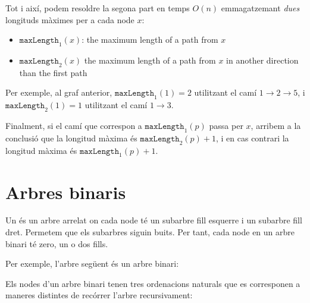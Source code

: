Tot i així, podem resoldre la segona part en temps $O(n)$
emmagatzemant \emph{dues} longituds màximes per a cada node $x$:
\begin{itemize}
\item $\texttt{maxLength}_1(x)$:
the maximum length of a path from $x$
\item $\texttt{maxLength}_2(x)$
the maximum length of a path from $x$
in another direction than the first path
\end{itemize}
Per exemple, al graf anterior, $\texttt{maxLength}_1(1)=2$ utilitzant
el camí $1 \rightarrow 2 \rightarrow 5$, i $\texttt{maxLength}_2(1)=1$
utilitzant el camí $1 \rightarrow 3$.

Finalment, si el camí que correspon a $\texttt{maxLength}_1(p)$ passa
per $x$, arribem a la conclusió que la longitud màxima és
$\texttt{maxLength}_2(p)+1$, i en cas contrari la longitud màxima és
$\texttt{maxLength}_1(p)+1$.



\section{Arbres binaris}


Un  és un arbre arrelat on cada node té
un subarbre fill esquerre i un subarbre fill dret. 
Permetem que els subarbres siguin buits. Per tant, cada node
en un arbre binari té zero, un o dos fills.

Per exemple, l'arbre següent és un arbre binari:
\begin{center}
\end{center}

  

Els nodes d'un arbre binari tenen tres ordenacions naturals que es
corresponen a maneres distintes de recórrer l'arbre recursivament:


